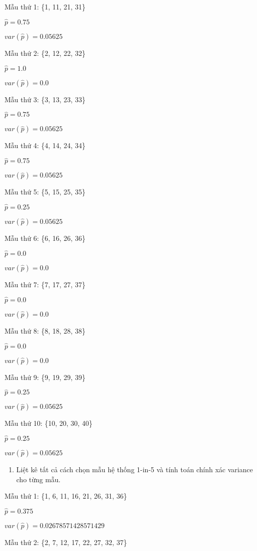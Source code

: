 \documentclass[
]{article}
\providecommand{\tightlist}{%
  \setlength{\itemsep}{0pt}\setlength{\parskip}{0pt}}
\begin{document}
Mẫu thứ 1: \{1, 11, 21, 31\}

\(\hat{p} = 0.75\)

\(var(\hat{p}) = 0.05625\)

Mẫu thứ 2: \{2, 12, 22, 32\}

\(\hat{p} = 1.0\)

\(var(\hat{p}) = 0.0\)

Mẫu thứ 3: \{3, 13, 23, 33\}

\(\hat{p} = 0.75\)

\(var(\hat{p}) = 0.05625\)

Mẫu thứ 4: \{4, 14, 24, 34\}

\(\hat{p} = 0.75\)

\(var(\hat{p}) = 0.05625\)

Mẫu thứ 5: \{5, 15, 25, 35\}

\(\hat{p} = 0.25\)

\(var(\hat{p}) = 0.05625\)

Mẫu thứ 6: \{6, 16, 26, 36\}

\(\hat{p} = 0.0\)

\(var(\hat{p}) = 0.0\)

Mẫu thứ 7: \{7, 17, 27, 37\}

\(\hat{p} = 0.0\)

\(var(\hat{p}) = 0.0\)

Mẫu thứ 8: \{8, 18, 28, 38\}

\(\hat{p} = 0.0\)

\(var(\hat{p}) = 0.0\)

Mẫu thứ 9: \{9, 19, 29, 39\}

\(\hat{p} = 0.25\)

\(var(\hat{p}) = 0.05625\)

Mẫu thứ 10: \{10, 20, 30, 40\}

\(\hat{p} = 0.25\)

\(var(\hat{p}) = 0.05625\)

\begin{enumerate}
\def\labelenumi{\alph{enumi})}
\setcounter{enumi}{1}
\tightlist
\item
  Liệt kê tất cả cách chọn mẫu hệ thống 1-in-5 và tính toán chính xác
  variance cho từng mẫu.
\end{enumerate}

Mẫu thứ 1: \{1, 6, 11, 16, 21, 26, 31, 36\}

\(\hat{p} = 0.375\)

\(var(\hat{p}) = 0.02678571428571429\)

Mẫu thứ 2: \{2, 7, 12, 17, 22, 27, 32, 37\}
\end{document}
